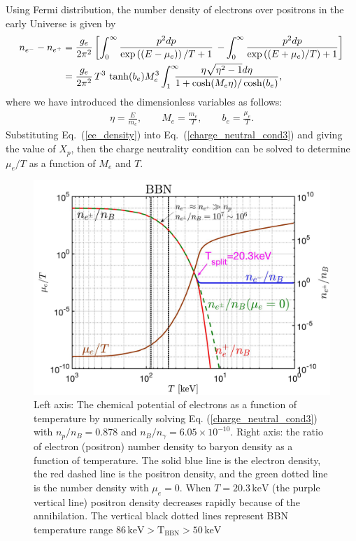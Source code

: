  Using Fermi distribution, the number density of electrons over positrons in the early Universe is given by
\begin{align}\label{ee_density}
n_{e^-}-n_{{e^+}}&=\frac{g_e}{2\pi^2}\left[\int_0^\infty\frac{p^2dp}{\exp{\left((E-\mu_e)\right)/T}+1}\right.\left.-\int_0^\infty\frac{p^2dp}{\exp{\left((E+\mu_e)/T\right)}+1}\right]\notag\\
&=\frac{g_e}{2\pi^2}\,{T^3}\,\tanh(b_e)M_e^3\int_{1}^\infty \!\!\!\!\frac{ \eta \sqrt{\eta^2-1} d\eta}{1+\cosh(M_e\eta)/\cosh(b_e)},
\end{align}
where we have introduced the dimensionless variables as follows: 
\begin{align}\label{Variables}
\eta=\frac{E}{m_e},\qquad M_e=\frac{m_e}{T},\qquad b_e=\frac{\mu_e}{T}.
\end{align}
Substituting Eq.~(\ref{ee_density}) into Eq.~(\ref{charge_neutral_cond3}) and giving the value of $X_p$, then the charge neutrality condition can be solved to determine $\mu_e/T$ as a function of $M_e$ and $T$. 

\begin{figure}
\centerline{\includegraphics[width=0.90\linewidth]{plots/chap03BBN/May152023_EPDensity_Chemical}}
\caption{Left axis: The chemical potential of electrons as a function of temperature by numerically solving Eq. (\ref{charge_neutral_cond3}) with $n_p/n_B=0.878$ and $n_B/n_\gamma=6.05\times10^{-10}$. Right axis: the ratio of electron (positron) number density to baryon density as a function of temperature. The solid blue line is the electron density, the red dashed line is the positron density, and the green dotted line is the number density with $\mu_e=0$. When $T=20.3\,\mathrm{keV}$ (the purple vertical line) positron density decreases rapidly because of the annihilation. The vertical black dotted lines represent BBN temperature range $86\,\mathrm{keV}>\mathrm{T_{BBN}}>50\,\mathrm{keV}$}
\label{BBN:Electron}
\end{figure}

